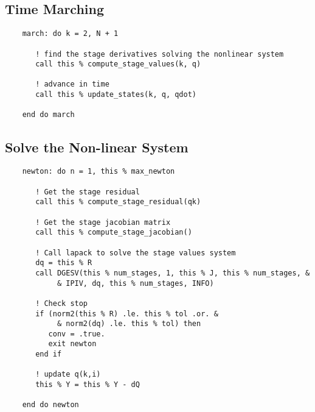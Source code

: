 \documentclass[pdftex,11pt,letter]{article}
\begin{document}
\subsection{Time Marching}

\begin{verbatim}
    march: do k = 2, N + 1

       ! find the stage derivatives solving the nonlinear system
       call this % compute_stage_values(k, q)
        
       ! advance in time
       call this % update_states(k, q, qdot)

    end do march
\end{verbatim}


\subsection{Solve the Non-linear System}

\begin{verbatim}
    newton: do n = 1, this % max_newton
       
       ! Get the stage residual
       call this % compute_stage_residual(qk)
       
       ! Get the stage jacobian matrix
       call this % compute_stage_jacobian()

       ! Call lapack to solve the stage values system
       dq = this % R
       call DGESV(this % num_stages, 1, this % J, this % num_stages, &
            & IPIV, dq, this % num_stages, INFO)

       ! Check stop
       if (norm2(this % R) .le. this % tol .or. &
            & norm2(dq) .le. this % tol) then
          conv = .true.
          exit newton
       end if
       
       ! update q(k,i)
       this % Y = this % Y - dQ
       
    end do newton
\end{verbatim}

\end{document}
